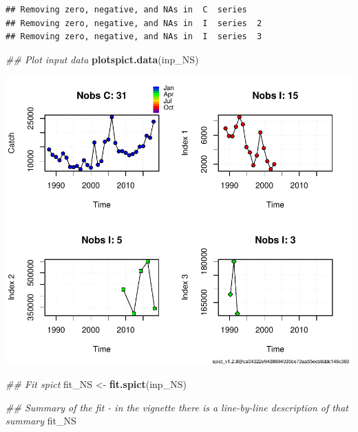 \documentclass[
]{article}
\newenvironment{Shaded}{\begin{snugshade}}{\end{snugshade}}
\newcommand{\CommentTok}[1]{\textcolor[rgb]{0.56,0.35,0.01}{\textit{#1}}}
\newcommand{\KeywordTok}[1]{\textcolor[rgb]{0.13,0.29,0.53}{\textbf{#1}}}
\newcommand{\NormalTok}[1]{#1}
\newcommand{\StringTok}[1]{\textcolor[rgb]{0.31,0.60,0.02}{#1}}
\begin{document}
\begin{verbatim}
## Removing zero, negative, and NAs in  C  series    
## Removing zero, negative, and NAs in  I  series  2  
## Removing zero, negative, and NAs in  I  series  3
\end{verbatim}

\begin{Shaded}
\begin{Highlighting}[]
\CommentTok{## Plot input data}
\KeywordTok{plotspict.data}\NormalTok{(inp_NS)}
\end{Highlighting}
\end{Shaded}

\includegraphics{aru.27.123a4_SPiCT_WD_files/figure-latex/fit_scenario5-1.pdf}

\begin{Shaded}
\begin{Highlighting}[]
\CommentTok{## Fit spict}
\NormalTok{fit_NS <-}\StringTok{ }\KeywordTok{fit.spict}\NormalTok{(inp_NS)}

\CommentTok{## Summary of the fit - in the vignette there is a line-by-line description of that summary}
\NormalTok{fit_NS}
\end{Highlighting}
\end{Shaded}
\end{document}
